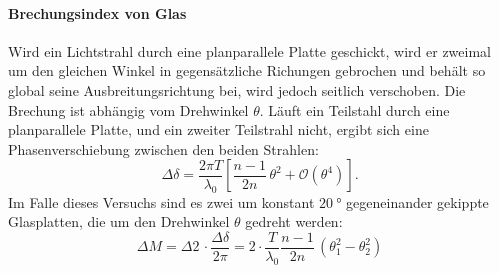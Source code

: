 \paragraph{Brechungsindex von Glas}
Wird ein Lichtstrahl durch eine planparallele Platte geschickt, wird er zweimal um den gleichen Winkel in gegensätzliche Richungen gebrochen und behält so global seine Ausbreitungsrichtung bei, wird jedoch seitlich verschoben.
Die Brechung ist abhängig vom Drehwinkel $\theta$.
Läuft ein Teilstahl durch eine planparallele Platte, und ein zweiter Teilstrahl nicht, ergibt sich eine Phasenverschiebung zwischen den beiden Strahlen:
\begin{equation*}
	\Delta \delta = \frac{2 \pi T}{\lambda_0} \left[ \frac{n-1}{2n} \, \theta^2 + \mathcal{O}(\theta^4) \right].
\end{equation*}
Im Falle dieses Versuchs sind es zwei um konstant $\SI{20}{°}$ gegeneinander gekippte Glasplatten, die um den Drehwinkel $\theta$ gedreht werden:
\begin{equation*}
	\Delta M = \Delta 2 \, \cdot \frac{\Delta \delta}{2 \pi} = 2 \cdot \frac{T}{\lambda_{0}} \frac{n-1}{2n} \, (\theta_1^2 - \theta_2^2)
\end{equation*}
\FloatBarrier
